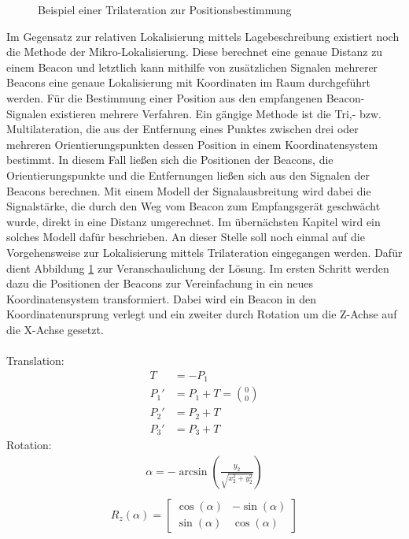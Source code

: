 \begin{figure}
\caption{Beispiel einer Trilateration zur Positionsbestimmung}
\label{fig:Trilat}
\end{figure}
Im Gegensatz zur relativen Lokalisierung mittels Lagebeschreibung existiert noch die Methode der Mikro-Lokalisierung. Diese berechnet eine genaue Distanz zu einem Beacon und letztlich kann mithilfe von zusätzlichen Signalen mehrerer Beacons eine genaue Lokalisierung mit Koordinaten im Raum durchgeführt werden. Für die Bestimmung einer Position aus den empfangenen Beacon-Signalen existieren mehrere Verfahren. Ein gängige Methode ist die Tri,- bzw. Multilateration, die aus der Entfernung eines Punktes zwischen drei oder mehreren Orientierungspunkten dessen Position in einem Koordinatensystem bestimmt. In diesem Fall ließen sich die Positionen der Beacons, die Orientierungspunkte und die Entfernungen ließen sich aus den Signalen der Beacons berechnen. Mit einem Modell der Signalausbreitung wird dabei die Signalstärke, die durch den Weg vom Beacon zum Empfangsgerät geschwächt wurde, direkt in eine Distanz umgerechnet. Im übernächsten Kapitel wird ein solches Modell dafür beschrieben. An dieser Stelle soll noch einmal auf die Vorgehensweise zur Lokalisierung mittels Trilateration eingegangen werden. Dafür dient Abbildung \ref{fig:Trilat} zur Veranschaulichung der Lösung. Im ersten Schritt werden dazu die Positionen der Beacons zur Vereinfachung in ein neues Koordinatensystem transformiert. Dabei wird ein Beacon in den Koordinatenursprung verlegt und ein zweiter durch Rotation um die Z-Achse auf die X-Achse gesetzt.\\ \\
Translation:
\begin{align*}
T &= -P_1\\
P_1' &= P_1 + T = \binom{0}{0}\\
P_2' &= P_2 + T\\
P_3' &= P_3 + T
\end{align*} 
Rotation:
\begin{align*}
\alpha = -\arcsin \left ( \frac{y_2}{\sqrt{x_2^2+y_2^2}} \right )\\
\end{align*} 
\begin{align*}
R_z\left ( \alpha \right ) = \begin{bmatrix}
\cos\left ( \alpha \right ) & -\sin\left ( \alpha \right )\\ 
\sin\left ( \alpha \right ) & \cos\left ( \alpha \right )
\end{bmatrix}\\
\end{align*}
